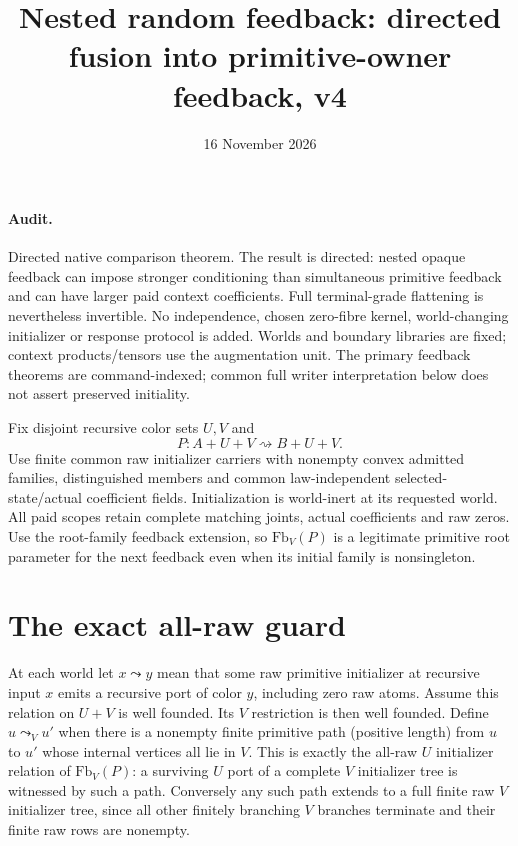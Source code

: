 \documentclass[11pt]{article}\usepackage{amsmath,amssymb,amsthm,geometry}\geometry{margin=1in}\newtheorem{lemma}{Lemma}\newtheorem{theorem}[lemma]{Theorem}
\title{Nested random feedback: directed fusion into primitive-owner feedback, v4}\date{16 November 2026}
\begin{document}
\maketitle
\paragraph{Audit.} Directed native comparison theorem. The result is directed: nested opaque feedback can impose stronger conditioning than simultaneous primitive feedback and can have larger paid context coefficients. Full terminal-grade flattening is nevertheless invertible. No independence, chosen zero-fibre kernel, world-changing initializer or response protocol is added. Worlds and boundary libraries are fixed; context products/tensors use the augmentation unit. The primary feedback theorems are command-indexed; common full writer interpretation below does not assert preserved initiality.

Fix disjoint recursive color sets $U,V$ and
\[
             P:A+U+V\rightsquigarrow B+U+V.
\]
Use finite common raw initializer carriers with nonempty convex admitted families, distinguished members and common law-independent selected-state/actual coefficient fields. Initialization is world-inert at its requested world. All paid scopes retain complete matching joints, actual coefficients and raw zeros. Use the root-family feedback extension, so $\mathrm{Fb}_V(P)$ is a legitimate primitive root parameter for the next feedback even when its initial family is nonsingleton.

\section{The exact all-raw guard}
At each world let $x\leadsto y$ mean that some raw primitive initializer at recursive input $x$ emits a recursive port of color $y$, including zero raw atoms. Assume this relation on $U+V$ is well founded. Its $V$ restriction is then well founded. Define $u\leadsto_Vu'$ when there is a nonempty finite primitive path (positive length) from $u$ to $u'$ whose internal vertices all lie in $V$. This is exactly the all-raw $U$ initializer relation of $\mathrm{Fb}_V(P)$: a surviving $U$ port of a complete $V$ initializer tree is witnessed by such a path. Conversely any such path extends to a full finite raw $V$ initializer tree, since all other finitely branching $V$ branches terminate and their finite raw rows are nonempty.
\end{document}

